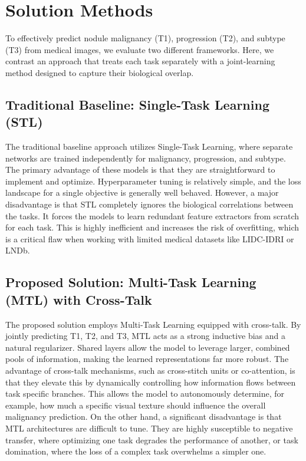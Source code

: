 \section{Solution Methods}
\label{section:solutionMethods}
To effectively predict nodule malignancy (T1), progression (T2), and subtype (T3) from medical images, we evaluate two different frameworks. Here, we contrast an approach that treats each task separately with a joint-learning method designed to capture their biological overlap.

\subsection{Traditional Baseline: Single-Task Learning (STL)}
The traditional baseline approach utilizes Single-Task Learning, where separate networks are trained independently for malignancy, progression, and subtype. The primary advantage of these models is that they are straightforward to implement and optimize. Hyperparameter tuning is relatively simple, and the loss landscape for a single objective is generally well behaved. However, a major disadvantage is that STL completely ignores the biological correlations between the tasks. It forces the models to learn redundant feature extractors from scratch for each task. This is highly inefficient and increases the risk of overfitting, which is a critical flaw when working with limited medical datasets like LIDC-IDRI or LNDb.

\subsection{Proposed Solution: Multi-Task Learning (MTL) with Cross-Talk}
The proposed solution employs Multi-Task Learning equipped with cross-talk. By jointly predicting T1, T2, and T3, MTL acts as a strong inductive bias and a natural regularizer. Shared layers allow the model to leverage larger, combined pools of information, making the learned representations far more robust. The advantage of cross-talk mechanisms, such as cross-stitch units or co-attention, is that they elevate this by dynamically controlling how information flows between task specific branches. This allows the model to autonomously determine, for example, how much a specific visual texture should influence the overall malignancy prediction. On the other hand, a significant disadvantage is that MTL architectures are difficult to tune. They are highly susceptible to negative transfer, where optimizing one task degrades the performance of another, or task domination, where the loss of a complex task overwhelms a simpler one.

